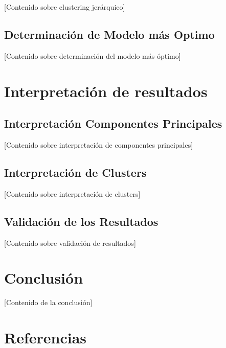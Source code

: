\documentclass[
  12pt,
]{book}
\begin{document}
{[}Contenido sobre clustering jerárquico{]}

\section{Determinación de Modelo más
Optimo}\label{determinaciuxf3n-de-modelo-muxe1s-optimo}

{[}Contenido sobre determinación del modelo más óptimo{]}

\chapter{Interpretación de
resultados}\label{interpretaciuxf3n-de-resultados}

\section{Interpretación Componentes
Principales}\label{interpretaciuxf3n-componentes-principales}

{[}Contenido sobre interpretación de componentes principales{]}

\section{Interpretación de
Clusters}\label{interpretaciuxf3n-de-clusters}

{[}Contenido sobre interpretación de clusters{]}

\section{Validación de los
Resultados}\label{validaciuxf3n-de-los-resultados}

{[}Contenido sobre validación de resultados{]}

\chapter{Conclusión}\label{conclusiuxf3n}

{[}Contenido de la conclusión{]}

\chapter{Referencias}\label{referencias}


\backmatter
\end{document}
